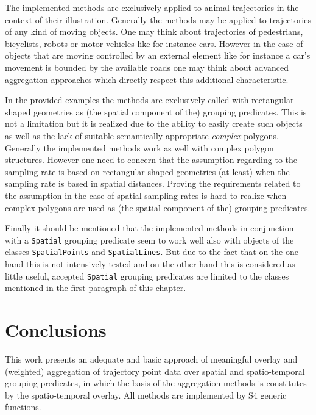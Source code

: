 \documentclass[12pt, oneside, a4paper]{scrbook}
\let\code=\texttt
\begin{document}
The implemented methods are exclusively applied to animal trajectories in the context of their illustration.
Generally the methods may be applied to trajectories of any kind of moving objects. 
One may think about trajectories of pedestrians, bicyclists, robots or motor vehicles like for instance cars. 
However in the case of objects that are moving controlled by an external element like for instance a car's movement is bounded by the available roads one may think about advanced aggregation approaches which directly respect this additional characteristic.
\par\medskip

In the provided examples the methods are exclusively called with rectangular shaped geometries as (the spatial component of the) grouping predicates.
This is not a limitation but it is realized due to the ability to easily create such objects as well as the lack of suitable semantically appropriate \textit{complex} polygons.
Generally the implemented methods work as well with complex polygon structures. 
However one need to concern that the assumption regarding to the sampling rate is based on rectangular shaped geometries (at least) when the sampling rate is based in spatial distances.
Proving the requirements related to the assumption in the case of spatial sampling rates is hard to realize when complex polygons are used as (the spatial component of the) grouping predicates.
\par\medskip

Finally it should be mentioned that the implemented methods in conjunction with a \code{Spatial} grouping predicate seem to work well also with objects of the classes \code{SpatialPoints} and \code{SpatialLines}. But due to the fact that on the one hand this is not intensively tested and on the other hand this is considered as little useful, accepted \code{Spatial} grouping predicates are limited to the classes mentioned in the first paragraph of this chapter.
\par\medskip




\chapter{Conclusions}
\label{chap:conclusions}
This work presents an adequate and basic approach of meaningful overlay and (weighted) aggregation of trajectory point data over spatial and spatio-temporal grouping predicates, 
in which the basis of the aggregation methods is constitutes by the spatio-temporal overlay.
All methods are implemented by S4 generic functions.
\par\medskip
\end{document}
